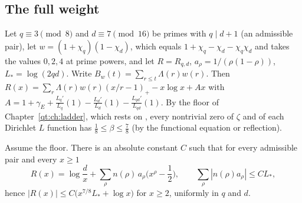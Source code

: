 \subsection{The full weight}

Let $q\equiv3\pmod8$ and $d\equiv7\pmod{16}$ be primes with $q\mid d+1$ (an admissible pair), let $w=(1+\chi_q)(1-\chi_d)$, which equals $1+\chi_q-\chi_d-\chi_q\chi_d$ and takes the values $0,2,4$ at prime powers, and let $R=R_{q,d}$, $a_\rho=1/(\rho(1-\rho))$, $L_*=\log(2qd)$. Write $B_w(t)=\sum_{r\le t}\Lambda(r)w(r)$. Then $R(x)=\sum_r\Lambda(r)w(r)(x/r-1)_+-x\log x+Ax$ with $A=1+\gamma_E+\frac{L_q'}{L_q}(1)-\frac{L_d'}{L_d}(1)-\frac{L_{qd}'}{L_{qd}}(1)$. By the floor of Chapter~\ref{qt:ch:ladder}, which rests on \cite{OAI26a}, every nontrivial zero of $\zeta$ and of each Dirichlet $L$ function has $\frac18\le\beta\le\frac78$ (by the functional equation or reflection).

\begin{theorem}\label{mq:thm:fullweight}
Assume the floor. There is an absolute constant $C$ such that for every admissible pair and every $x\ge1$
\[
R(x)=\log\frac dx+\sum_\rho n(\rho)\,a_\rho\Big(x^\rho-\frac12\Big),\qquad\sum_\rho|n(\rho)a_\rho|\le CL_*,
\]
hence $|R(x)|\le C\big(x^{7/8}L_*+\log x\big)$ for $x\ge2$, uniformly in $q$ and $d$.
\end{theorem}

